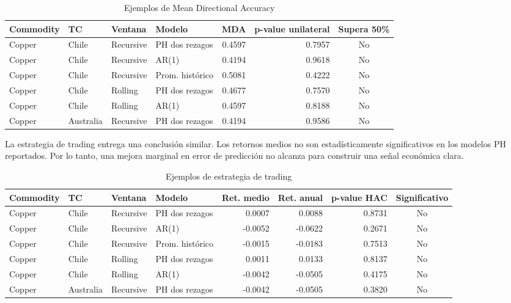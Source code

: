 \documentclass[11pt,a4paper]{article}
\begin{document}
\begin{table}[H]
\centering
\caption{Ejemplos de Mean Directional Accuracy}
\scriptsize
\begin{tabular}{llllrrc}
\toprule
Commodity & TC & Ventana & Modelo & MDA & p-value unilateral & Supera 50\% \\
\midrule
Copper & Chile & Recursive & PH dos rezagos & 0.4597 & 0.7957 & No \\
Copper & Chile & Recursive & AR(1) & 0.4194 & 0.9618 & No \\
Copper & Chile & Recursive & Prom. histórico & 0.5081 & 0.4222 & No \\
Copper & Chile & Rolling & PH dos rezagos & 0.4677 & 0.7570 & No \\
Copper & Chile & Rolling & AR(1) & 0.4597 & 0.8188 & No \\
Copper & Australia & Recursive & PH dos rezagos & 0.4194 & 0.9586 & No \\
\bottomrule
\end{tabular}
\end{table}

La estrategia de trading entrega una conclusión similar. Los retornos medios no son estadísticamente significativos en los modelos PH reportados. Por lo tanto, una mejora marginal en error de predicción no alcanza para construir una señal económica clara.

\begin{table}[H]
\centering
\caption{Ejemplos de estrategia de trading}
\scriptsize
\begin{tabular}{llllrrrc}
\toprule
Commodity & TC & Ventana & Modelo & Ret. medio & Ret. anual & p-value HAC & Significativo \\
\midrule
Copper & Chile & Recursive & PH dos rezagos & 0.0007 & 0.0088 & 0.8731 & No \\
Copper & Chile & Recursive & AR(1) & -0.0052 & -0.0622 & 0.2671 & No \\
Copper & Chile & Recursive & Prom. histórico & -0.0015 & -0.0183 & 0.7513 & No \\
Copper & Chile & Rolling & PH dos rezagos & 0.0011 & 0.0133 & 0.8137 & No \\
Copper & Chile & Rolling & AR(1) & -0.0042 & -0.0505 & 0.4175 & No \\
Copper & Australia & Recursive & PH dos rezagos & -0.0042 & -0.0505 & 0.3820 & No \\
\bottomrule
\end{tabular}
\end{table}
\end{document}
